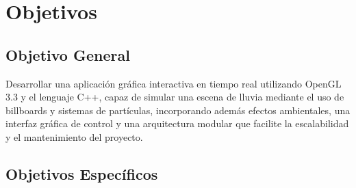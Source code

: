 \chapter{Objetivos}

\section{Objetivo General}

Desarrollar una aplicación gráfica interactiva en tiempo real utilizando OpenGL 3.3 y el lenguaje C++, capaz de simular una escena de lluvia mediante el uso de billboards y sistemas de partículas, incorporando además efectos ambientales, una interfaz gráfica de control y una arquitectura modular que facilite la escalabilidad y el mantenimiento del proyecto.

\section{Objetivos Específicos}

